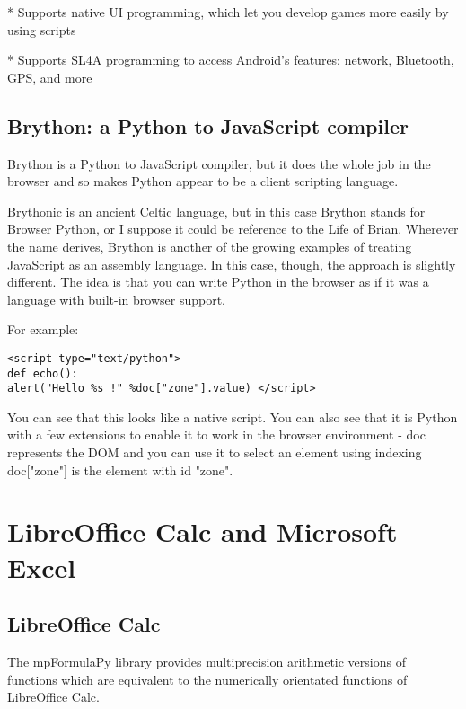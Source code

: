 * Supports native UI programming, which let you develop games more easily by using scripts 

* Supports SL4A programming to access Android’s features: network, Bluetooth, GPS, and more




\newpage
\section{Brython: a Python to JavaScript compiler}

Brython is a Python to JavaScript compiler, but it does the whole job in the browser and so makes Python appear to be a client scripting language. 

Brythonic is an ancient Celtic language, but in this case Brython stands for Browser Python, or I suppose it could be reference to the Life of Brian. Wherever the name derives, Brython is another of the growing examples of treating JavaScript as an assembly language. In this case, though, the approach is slightly different. The idea is that you can write Python in the browser as if it was a language with built-in browser support. 

For example:

\begin{lstlisting}
<script type="text/python">
def echo():
alert("Hello %s !" %doc["zone"].value) </script>
\end{lstlisting}

You can see that this looks like a native script. You can also see that it is Python with a few extensions to enable it to work in the browser environment - doc represents the DOM and you can use it to select an element using indexing doc["zone"] is the element with id "zone". 









\chapter{LibreOffice Calc and Microsoft Excel}
\label{Spreadsheets} 


\section{LibreOffice Calc}
The mpFormulaPy library provides multiprecision arithmetic versions of  functions which are equivalent to the numerically orientated functions of LibreOffice Calc.

